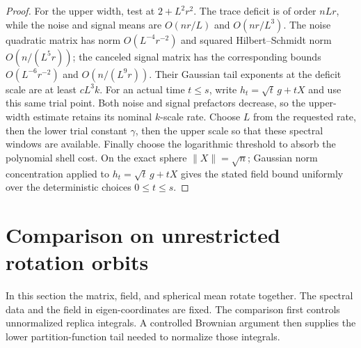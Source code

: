 \begin{proof}
For the upper width, test at $2+L^2r^2$. The trace deficit is of order
$nLr$, while the noise and signal means are $O(nr/L)$ and
$O(nr/L^3)$. The noise quadratic matrix has norm
$O(L^{-4}r^{-2})$ and squared Hilbert--Schmidt norm $O(n/(L^5r))$;
the canceled signal matrix has the corresponding bounds
$O(L^{-6}r^{-2})$ and $O(n/(L^9r))$. Their Gaussian tail exponents at
the deficit scale are at least $cL^3k$. For an actual time $t\le s$,
write $h_t=\sqrt t\,g+tX$ and use this same trial point. Both noise
and signal prefactors decrease, so the upper-width estimate retains
its nominal $k$-scale rate. Choose $L$ from the requested rate, then
the lower trial constant $\gamma$, then the upper scale so that these
spectral windows are available. Finally choose the logarithmic
threshold to absorb the polynomial shell cost.
On the exact sphere $\|X\|=\sqrt n$; Gaussian norm
concentration applied to $h_t=\sqrt t\,g+tX$ gives the stated field
bound uniformly over the deterministic choices $0\le t\le s$.
\end{proof}

\section{Comparison on unrestricted rotation orbits}
\label{prof:sec:unconstrained}

In this section the matrix, field, and spherical mean rotate together.
The spectral data and the field in eigen-coordinates are fixed.
The comparison first controls unnormalized replica integrals.
A controlled Brownian argument then supplies the lower partition-function
tail needed to normalize those integrals.

